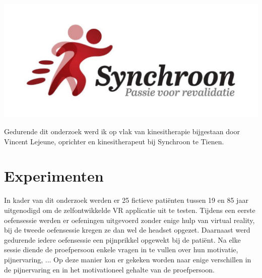 \documentclass[a0,portrait]{a0poster}
\begin{document}
\begin{multicols}{2}
\begin{center}\vspace{1cm}
    \includegraphics[width=0.5\linewidth]{synchroon}
\end{center}\vspace{1cm}

Gedurende dit onderzoek werd ik op vlak van kinesitherapie bijgestaan door Vincent Lejeune,
oprichter en kinesitherapeut bij Synchroon te Tienen.

\color{Black} %
\color{HoGentAccent1} 
\section*{Experimenten}
\color{black}
In kader van dit onderzoek werden er 25 fictieve patiënten tussen 19 en 85 jaar uitgenodigd om de
zelfontwikkelde VR applicatie uit te testen. Tijdens een eerste oefensessie werden er oefeningen uitgevoerd
zonder enige hulp van virtual reality, bij de tweede oefensessie kregen ze dan wel de headset
opgezet. Daarnaast werd gedurende iedere oefensessie een pijnprikkel opgewekt bij de patiënt. Na
elke sessie diende de proefpersoon enkele vragen in te vullen over hun motivatie, pijnervaring, ... Op
deze manier kon er gekeken worden naar enige verschillen in de pijnervaring en in het motivationeel
gehalte van de proefpersoon.



\color{HoGentAccent1} 

\color{black}



\end{multicols}
\end{document}

